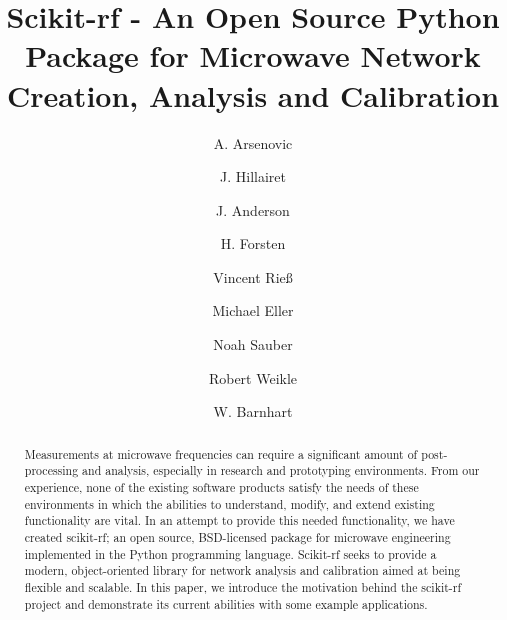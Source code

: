 \documentclass{IEEEjmw}
\begin{document}

\title{Scikit-rf - An Open Source Python Package for Microwave Network Creation, Analysis and Calibration} 


\author{A. Arsenovic}

%

\author{J. Hillairet}

\author{J. Anderson}

\author{H. Forsten}

\author{Vincent Rieß}

\author{Michael Eller}

\author{Noah Sauber}

\author{Robert Weikle}

\author{W. Barnhart}






\begin{abstract}
Measurements at microwave frequencies can require a  significant  amount of post-processing  and  analysis,  especially  in research  and  prototyping environments.  From  our  experience, none  of   the   existing   software   products  satisfy   the   needs   of these environments in which the abilities to understand, modify, and  extend  existing  functionality  are  vital.  In  an  attempt  to provide this  needed  functionality,  we  have  created  scikit-rf;  an open  source,  BSD-licensed  package  for  microwave  engineering implemented   in   the   Python  programming   language.   Scikit-rf seeks  to  provide  a  modern,  object-oriented  library  for  network analysis  and  calibration  aimed  at  being  flexible  and scalable. In  this  paper,  we  introduce  the  motivation  behind  the  scikit-rf  project   and   demonstrate  its  current   abilities   with   some example applications.
\end{abstract}
\end{document}

